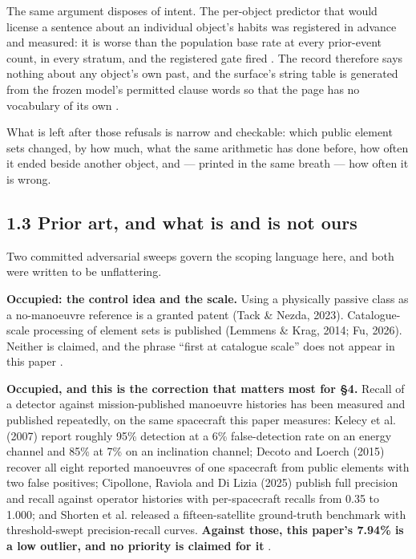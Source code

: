 \documentclass[11pt]{article}
\begin{document}
The same argument disposes of intent. The per-object predictor that would license a sentence about an individual object's habits was registered in advance and measured: it is worse than the population base rate at every prior-event count, in every stratum, and the registered gate fired%
. The record therefore says nothing about any object's own past, and the surface's string table is generated from the frozen model's permitted clause words so that the page has no vocabulary of its own%
.

What is left after those refusals is narrow and checkable: which public element sets changed, by how much, what the same arithmetic has done before, how often it ended beside another object, and --- printed in the same breath --- how often it is wrong.

\subsection*{1.3 Prior art, and what is and is not ours}

Two committed adversarial sweeps govern the scoping language here, and both were written to be unflattering.

\textbf{Occupied: the control idea and the scale.} Using a physically passive class as a no-manoeuvre reference is a granted patent (Tack \& Nezda, 2023). Catalogue-scale processing of element sets is published (Lemmens \& Krag, 2014; Fu, 2026). Neither is claimed, and the phrase ``first at catalogue scale'' does not appear in this paper%
.

\textbf{Occupied, and this is the correction that matters most for \S{}4.} Recall of a detector against mission-published manoeuvre histories has been measured and published repeatedly, on the same spacecraft this paper measures: Kelecy et al. (2007) report roughly 95\% detection at a 6\% false-detection rate on an energy channel and 85\% at 7\% on an inclination channel; Decoto and Loerch (2015) recover all eight reported manoeuvres of one spacecraft from public elements with two false positives; Cipollone, Raviola and Di Lizia (2025) publish full precision and recall against operator histories with per-spacecraft recalls from 0.35 to 1.000; and Shorten et al. released a fifteen-satellite ground-truth benchmark with threshold-swept precision-recall curves. \textbf{Against those, this paper's 7.94\% is a low outlier, and no priority is claimed for it}%
.
\end{document}
